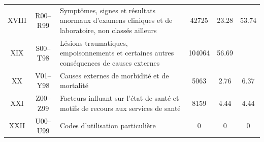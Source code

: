 \documentclass[12pt,english,french,twoside]{report}\usepackage[]{graphicx}\usepackage[]{color}
\begin{document}
\begin{longtable}{|c|c|m{4cm}|c|c|c|}

XVIII&R00–R99&Symptômes, signes et résultats anormaux d'examens cliniques et de laboratoire, non classés ailleurs&42725&23.28&53.74\\

XIX&S00–T98&Lésions traumatiques, empoisonnements et certaines autres conséquences de causes externes&104064&56.69& \\

XX&V01–Y98&Causes externes de morbidité et de mortalité& 5063&2.76&6.37\\

XXI&Z00–Z99&Facteurs influant sur l'état de santé et motifs de recours aux services de santé&8159&4.44&4.44\\

XXII&U00–U99&Codes d'utilisation particulière & 0&0&0\\

  \hline
\end{longtable}
\end{document}
